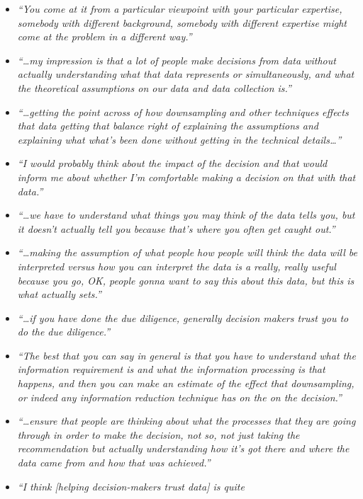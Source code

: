 \documentclass{article}
\begin{document}
\begin{itemize}
\item
  \emph{``You come at it from a particular viewpoint with your
  particular expertise, somebody with different background, somebody
  with different expertise might come at the problem in a different
  way.''}
\item
  \emph{``\ldots my impression is that a lot of people make decisions
  from data without actually understanding what that data represents or
  simultaneously, and what the theoretical assumptions on our data and
  data collection is.''}
\item
  \emph{``\ldots getting the point across of how downsampling and other
  techniques effects that data getting that balance right of explaining
  the assumptions and explaining what what's been done without getting
  in the technical details\ldots{}''}
\item
  \emph{``I would probably think about the impact of the decision and
  that would inform me about whether I'm comfortable making a decision
  on that with that data.''}
\item
  \emph{``\ldots we have to understand what things you may think of the
  data tells you, but it doesn't actually tell you because that's where
  you often get caught out.''}
\item
  \emph{``\ldots making the assumption of what people how people will
  think the data will be interpreted versus how you can interpret the
  data is a really, really useful because you go, OK, people gonna want
  to say this about this data, but this is what actually sets.''}
\item
  \emph{``\ldots if you have done the due diligence, generally decision
  makers trust you to do the due diligence.''}
\item
  \emph{``The best that you can say in general is that you have to
  understand what the information requirement is and what the
  information processing is that happens, and then you can make an
  estimate of the effect that downsampling, or indeed any information
  reduction technique has on the on the decision.''}
\item
  \emph{``\ldots ensure that people are thinking about what the
  processes that they are going through in order to make the decision,
  not so, not just taking the recommendation but actually understanding
  how it's got there and where the data came from and how that was
  achieved.''}
\item
  \emph{``I think {[}helping decision-makers trust data{]} is quite
}
\end{itemize}
\end{document}
